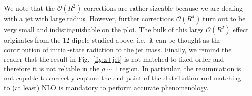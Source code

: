  We note that the $\mathcal{O}(R^2)$ corrections are rather sizeable because we are dealing with a jet with large radius. However, further corrections $\mathcal{O}(R^4)$ turn out to be very small and indistinguishable on the plot. The bulk of this large $\mathcal{O}(R^2)$ effect originates from the $12$ dipole studied above, i.e.\ it can be thought as the contribution of initial-state radiation to the jet mass. 
Finally, we remind the reader that the result in Fig.~\ref{fig:z+jet}
is not matched to fixed-order and therefore it is not reliable in the
$\rho\sim 1$ region. In particular, the resummation is not capable to
correctly capture the end-point of the distribution and matching to
(at least) NLO is mandatory to perform accurate phenomenology. 



